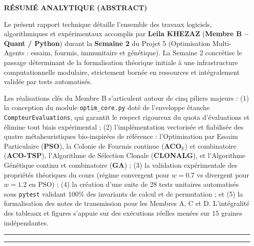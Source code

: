 \documentclass[11pt,a4paper]{article}
\begin{document}
\thispagestyle{plain}
\vspace*{-0.5cm}
\begin{center}
    {\large\bfseries\color{ensablue} RÉSUMÉ ANALYTIQUE (ABSTRACT)}
\end{center}
\vspace*{-0.2cm}
Le présent rapport technique détaille l'ensemble des travaux logiciels, algorithmiques et expérimentaux accomplis par \textbf{Leila KHEZAZ} (\textbf{Membre B -- Quant / Python}) durant la \textbf{Semaine 2} du Projet 5 (Optimisation Multi-Agents : essaim, fourmis, immunitaire et génétique). La Semaine 2 concrétise le passage déterminant de la formalisation théorique initiale à une infrastructure computationnelle modulaire, strictement bornée en ressources et intégralement validée par tests automatisés.

Les réalisations clés du Membre B s'articulent autour de cinq piliers majeurs : (1) la conception du module \texttt{optim\_core.py} doté de l'enveloppe étanche \texttt{CompteurEvaluations}, qui garantit le respect rigoureux du quota d'évaluations et élimine tout biais expérimental ; (2) l'implémentation vectorisée et fiabilisée des quatre métaheuristiques bio-inspirées de référence : l'Optimisation par Essaim Particulaire (\textbf{PSO}), la Colonie de Fourmis continue (\textbf{ACO}$_\mathbb{R}$) et combinatoire (\textbf{ACO-TSP}), l'Algorithme de Sélection Clonale (\textbf{CLONALG}), et l'Algorithme Génétique continu et combinatoire (\textbf{GA}) ; (3) la validation expérimentale des propriétés théoriques du cours (régime convergent pour $w=0.7$ vs divergent pour $w=1.2$ en PSO) ; (4) la création d'une suite de 28 tests unitaires automatisés sous \texttt{pytest} validant 100\% des invariants de calcul et de permutation ; et (5) la formalisation des notes de transmission pour les Membres A, C et D. L'intégralité des tableaux et figures s'appuie sur des exécutions réelles menées sur 15 graines indépendantes.

\vspace{0.4cm}
\hrule
\vspace{0.3cm}
\tableofcontents
\vspace{0.3cm}
\hrule
\newpage

\end{document}

